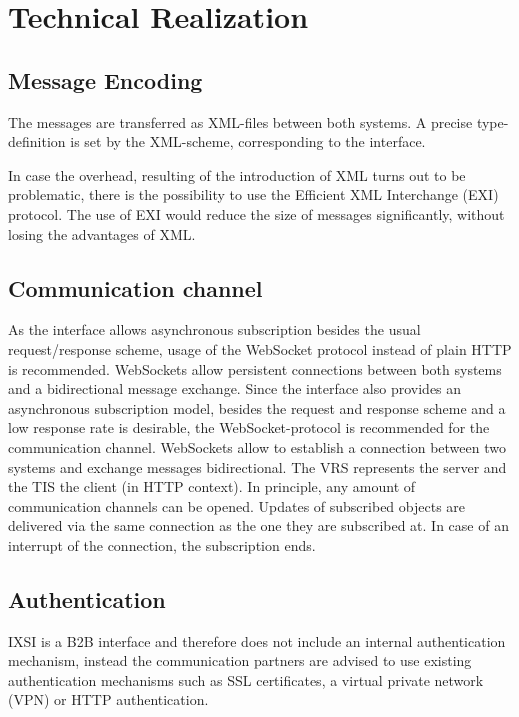 \chapter{Technical Realization}
\label{sec:TechnischeRealisierung}


\section{Message Encoding}
The messages are transferred as XML-files between both systems. A precise type-definition is set by the XML-scheme, corresponding to the interface.

In case the overhead, resulting of the introduction of XML turns out to be problematic, there is the possibility to use the Efficient XML Interchange (EXI) protocol. The use of EXI would reduce the size of messages significantly, without losing the advantages of XML. 

\section{Communication channel}
As the interface allows asynchronous subscription besides the usual request/response scheme, usage of the WebSocket protocol instead of plain HTTP is recommended.
WebSockets allow persistent connections between both systems and a bidirectional message exchange. Since the interface also provides an asynchronous subscription model, besides the request and response scheme and a low response rate is desirable, the WebSocket-protocol is recommended for the communication channel. WebSockets allow to establish a connection between two systems and exchange messages bidirectional. The VRS represents the server and the TIS the client (in HTTP context). In principle, any amount of communication channels can be opened. Updates of subscribed objects are delivered via the same connection as the one they are subscribed at. In case of an interrupt of the connection, the subscription ends.

\section{Authentication}
IXSI is a B2B interface and therefore does not include an internal authentication mechanism, instead the communication partners are advised to use existing authentication mechanisms such as SSL certificates, a virtual private network (VPN) or HTTP authentication.

